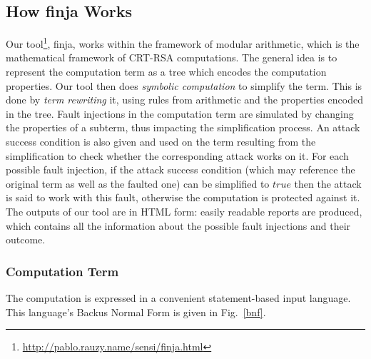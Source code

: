 \documentclass[10pt]{article}
\theoremstyle{definition}
\theoremstyle{theorem}
\newcommand{\finja}{\textsf{finja}\xspace}
\begin{document}
\subsection{How \finja Works}
\label{sec-methods-finja}

Our tool\footnote{\url{http://pablo.rauzy.name/sensi/finja.html}}, \finja, works within the framework of modular arithmetic, which is the mathematical framework of CRT-RSA computations.
The general idea is to represent the computation term as a tree which encodes the computation properties.
Our tool then does \emph{symbolic computation} to simplify the term.
This is done by \emph{term rewriting} it, using rules from arithmetic and the properties encoded in the tree.
Fault injections in the computation term are simulated by changing the properties of a subterm, thus impacting the simplification process.
An attack success condition is also given and used on the term resulting from the simplification to check whether the corresponding attack works on it.
For each possible fault injection, if the attack success condition (which may reference the original term as well as the faulted one) can be simplified to $true$ then the attack is said to work with this fault, otherwise the computation is protected against it.
The outputs of our tool are in HTML form: easily readable reports are produced, which contains all the information about the possible fault injections and their outcome.

\subsubsection{Computation Term}
\label{finja-term}

The computation is expressed in a convenient statement-based input language.
This language's Backus Normal Form is given in Fig.~\ref{bnf}.
\end{document}
